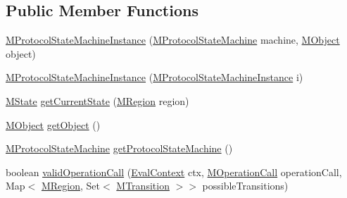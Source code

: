 \subsection*{Public Member Functions}
\begin{DoxyCompactItemize}
\item 
\hyperlink{classorg_1_1tzi_1_1use_1_1uml_1_1sys_1_1statemachines_1_1_m_protocol_state_machine_instance_a45c9620cf7869d9d0d751b133bfef1bb}{M\-Protocol\-State\-Machine\-Instance} (\hyperlink{classorg_1_1tzi_1_1use_1_1uml_1_1mm_1_1statemachines_1_1_m_protocol_state_machine}{M\-Protocol\-State\-Machine} machine, \hyperlink{interfaceorg_1_1tzi_1_1use_1_1uml_1_1sys_1_1_m_object}{M\-Object} object)
\item 
\hyperlink{classorg_1_1tzi_1_1use_1_1uml_1_1sys_1_1statemachines_1_1_m_protocol_state_machine_instance_acb8174ccf485f5e95a4da7f870351cc7}{M\-Protocol\-State\-Machine\-Instance} (\hyperlink{classorg_1_1tzi_1_1use_1_1uml_1_1sys_1_1statemachines_1_1_m_protocol_state_machine_instance}{M\-Protocol\-State\-Machine\-Instance} i)
\item 
\hyperlink{classorg_1_1tzi_1_1use_1_1uml_1_1mm_1_1statemachines_1_1_m_state}{M\-State} \hyperlink{classorg_1_1tzi_1_1use_1_1uml_1_1sys_1_1statemachines_1_1_m_protocol_state_machine_instance_a7d9219776201320432ddce9d2aef9f84}{get\-Current\-State} (\hyperlink{classorg_1_1tzi_1_1use_1_1uml_1_1mm_1_1statemachines_1_1_m_region}{M\-Region} region)
\item 
\hyperlink{interfaceorg_1_1tzi_1_1use_1_1uml_1_1sys_1_1_m_object}{M\-Object} \hyperlink{classorg_1_1tzi_1_1use_1_1uml_1_1sys_1_1statemachines_1_1_m_protocol_state_machine_instance_abcf2b42c3ddf82a897d4b387c8a0d275}{get\-Object} ()
\item 
\hyperlink{classorg_1_1tzi_1_1use_1_1uml_1_1mm_1_1statemachines_1_1_m_protocol_state_machine}{M\-Protocol\-State\-Machine} \hyperlink{classorg_1_1tzi_1_1use_1_1uml_1_1sys_1_1statemachines_1_1_m_protocol_state_machine_instance_a906d08c5bd9903acaa33e197218c3787}{get\-Protocol\-State\-Machine} ()
\item 
boolean \hyperlink{classorg_1_1tzi_1_1use_1_1uml_1_1sys_1_1statemachines_1_1_m_protocol_state_machine_instance_ad79f5257326736196688d254c5da23b2}{valid\-Operation\-Call} (\hyperlink{classorg_1_1tzi_1_1use_1_1uml_1_1ocl_1_1expr_1_1_eval_context}{Eval\-Context} ctx, \hyperlink{classorg_1_1tzi_1_1use_1_1uml_1_1sys_1_1_m_operation_call}{M\-Operation\-Call} operation\-Call, Map$<$ \hyperlink{classorg_1_1tzi_1_1use_1_1uml_1_1mm_1_1statemachines_1_1_m_region}{M\-Region}, Set$<$ \hyperlink{classorg_1_1tzi_1_1use_1_1uml_1_1mm_1_1statemachines_1_1_m_transition}{M\-Transition} $>$$>$ possible\-Transitions)
$$
\end{DoxyCompactItemize}
